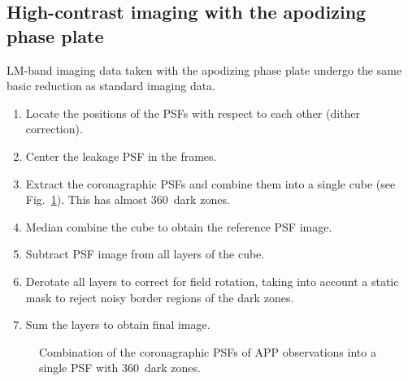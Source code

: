 \subsection{High-contrast imaging with the apodizing phase plate}
\label{ssec:algo_app_imaging}

LM-band imaging data taken with the apodizing phase plate undergo the
same basic reduction as standard imaging data. 



\begin{enumerate}
\item Locate the positions of the PSFs with respect to each other
  (dither correction).
\item Center the leakage PSF in the frames.
\item Extract the coronagraphic PSFs and combine them into a single
  cube (see Fig.~\ref{fig:app_psf_combine}). This has almost
  360\degr\ dark zones.
\item Median combine the cube to obtain the reference PSF image.
\item Subtract PSF image from all layers of the cube.
\item Derotate all layers to correct for field rotation, taking into
  account a static mask to reject noisy border regions of the dark
  zones.
\item Sum the layers to obtain final image.
\end{enumerate}

\begin{figure}
  \centering
  \caption{Combination of the coronagraphic PSFs of APP observations
    into a single PSF with 360\degr\ dark zones. }
  \label{fig:app_psf_combine}
\end{figure}

